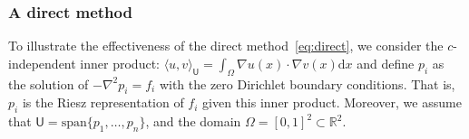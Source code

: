 \documentclass[12pt]{amsart}
\begin{document}
\subsubsection{A direct method}
To illustrate the effectiveness of the direct method~\eqref{eq:direct}, we consider the $c$-independent inner product: $\langle u, v\rangle_{\mathsf{U}} = \int_{\Omega} \nabla u(x)\cdot\nabla v(x) \mathrm{d}x$ and define $p_i$ as the solution of $- \nabla^2 p_i = f_i$ with the zero Dirichlet boundary conditions. That is, $p_i$ is the Riesz representation of $f_i$ given this inner product. Moreover, we assume that $\mathsf{U} = \text{span}\{p_1,\ldots, p_n\}$, and the domain $\Omega = [0,1]^2 \subset \mathbb{R}^2$.

\begin{figure}
    \centering
    \\

\end{figure}
\end{document}
